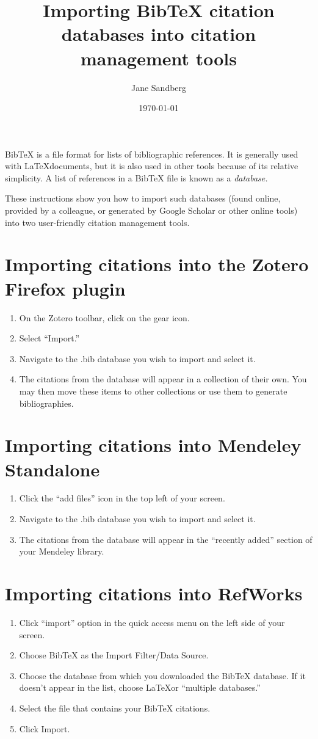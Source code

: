 \documentclass[11pt,a4paper]{article}
\title{Importing BibTeX citation databases into citation management tools}
\author{Jane Sandberg}
\date{\today}
\begin{document}
\maketitle

BibTeX is a file format for lists of bibliographic references.  It is generally used with \LaTeX documents, but it is also used in other tools because of its relative simplicity.  A list of references in a BibTeX file is known as a \emph{database.}

These instructions show you how to import such databases (found online, provided by a colleague, or generated by Google Scholar or other online tools) into two user-friendly citation management tools.

\section*{Importing citations into the Zotero Firefox plugin}
\begin{enumerate}
\item On the Zotero toolbar, click on the gear icon.
\item Select ``Import.''
\item Navigate to the .bib database you wish to import and select it.
\item The citations from the database will appear in a collection of their own.  You may then move these items to other collections or use them to generate bibliographies.
\end{enumerate}


\section*{Importing citations into Mendeley Standalone}
\begin{enumerate}
\item Click the ``add files'' icon in the top left of your screen.
\item Navigate to the .bib database you wish to import and select it.
\item The citations from the database will appear in the ``recently added'' section of your Mendeley library.
\end{enumerate}

\section*{Importing citations into RefWorks}
\begin{enumerate}
\item Click ``import'' option in the quick access menu on the left side of your screen.
\item Choose BibTeX as the Import Filter/Data Source.
\item Choose the database from which you downloaded the BibTeX database.  If it doesn't appear in the list, choose \LaTeX or ``multiple databases.''
\item Select the file that contains your BibTeX citations.
\item Click Import.
\end{enumerate}
\end{document}
